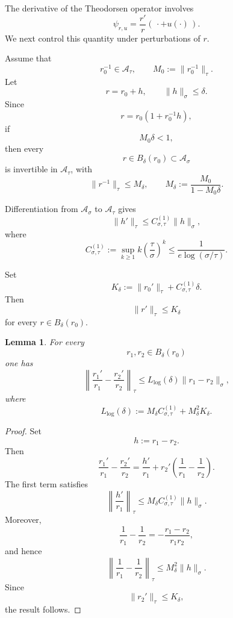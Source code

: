 \documentclass[11pt,a4paper]{amsart}
\newtheorem{lemma}[theorem]{Lemma}
\begin{document}
The derivative of the Theodorsen operator involves
\[
\psi_{r,u}
=
\frac{r'}r(\,\cdot+u(\cdot)\,).
\]
We next control this quantity under perturbations of $r$.

Assume that
\begin{equation}\label{eq:r0-inverse-tau}
	r_0^{-1}\in\mathcal A_\tau,
	\qquad
	M_0:=\|r_0^{-1}\|_\tau.
\end{equation}
Let
\[
r=r_0+h,
\qquad
\|h\|_\sigma\le\delta.
\]
Since
\[
r=r_0(1+r_0^{-1}h),
\]
if
\begin{equation}\label{eq:inverse-condition}
	M_0\delta<1,
\end{equation}
then every
\[
r\in B_\delta(r_0)\subset\mathcal A_\sigma
\]
is invertible in $\mathcal A_\tau$, with
\begin{equation}\label{eq:Mdelta}
	\|r^{-1}\|_\tau
	\le
	M_\delta,
	\qquad
	M_\delta
	:=
	\frac{M_0}{1-M_0\delta}.
\end{equation}

Differentiation from $\mathcal A_\sigma$ to $\mathcal A_\tau$ gives
\begin{equation}\label{eq:fourier-derivative}
	\|h'\|_\tau
	\le
	C_{\sigma,\tau}^{(1)}
	\|h\|_\sigma,
\end{equation}
where
\begin{equation}\label{eq:C1}
	C_{\sigma,\tau}^{(1)}
	:=
	\sup_{k\ge1}
	k\left(\frac{\tau}{\sigma}\right)^k
	\le
	\frac1{e\log(\sigma/\tau)}.
\end{equation}

Set
\begin{equation}\label{eq:Kdelta}
	K_\delta:=\|r_0'\|_\tau+C_{\sigma,\tau}^{(1)}\delta.
\end{equation}
Then
\[
\|r'\|_\tau\le K_\delta
\]
for every $r\in B_\delta(r_0)$.

\begin{lemma}\label{lem:logderivative}
	For every
	\[
	r_1,r_2\in B_\delta(r_0)
	\]
	one has
	\begin{equation}\label{eq:logderivative}
		\left\|
		\frac{r_1'}{r_1}
		-
		\frac{r_2'}{r_2}
		\right\|_\tau
		\le
		L_{\log}(\delta)
		\|r_1-r_2\|_\sigma,
	\end{equation}
	where
	\begin{equation}\label{eq:Llog}
		L_{\log}(\delta)
		:=
		M_\delta C_{\sigma,\tau}^{(1)}
		+
		M_\delta^2K_\delta.
	\end{equation}
\end{lemma}

\begin{proof}
	Set
	\[
	h:=r_1-r_2.
	\]
	Then
	\[
	\frac{r_1'}{r_1}
	-
	\frac{r_2'}{r_2}
	=
	\frac{h'}{r_1}
	+
	r_2'
	\left(
	\frac1{r_1}-\frac1{r_2}
	\right).
	\]
	The first term satisfies
	\[
	\left\|\frac{h'}{r_1}\right\|_\tau
	\le
	M_\delta
	C_{\sigma,\tau}^{(1)}
	\|h\|_\sigma.
	\]
	Moreover,
	\[
	\frac1{r_1}-\frac1{r_2}
	=
	-\frac{r_1-r_2}{r_1r_2},
	\]
	and hence
	\[
	\left\|
	\frac1{r_1}-\frac1{r_2}
	\right\|_\tau
	\le
	M_\delta^2\|h\|_\sigma.
	\]
	Since
	\[
	\|r_2'\|_\tau\le K_\delta,
	\]
	the result follows.
\end{proof}
\end{document}
